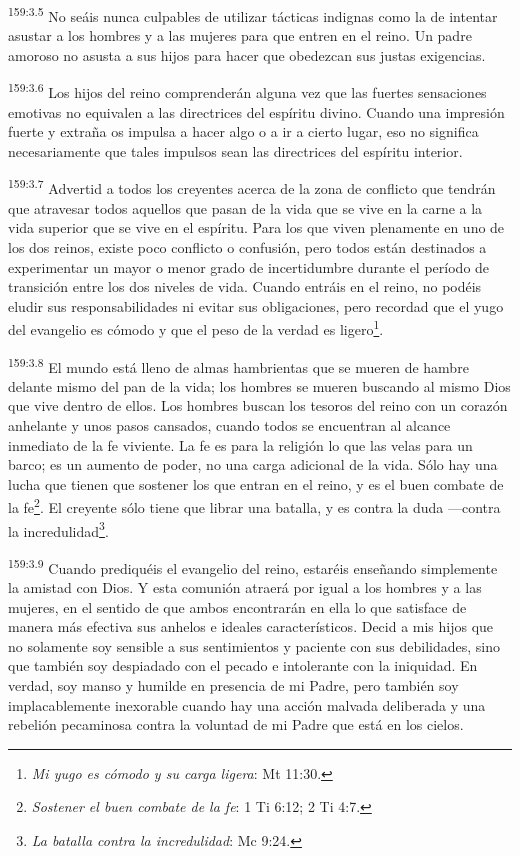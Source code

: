 \par 
\textsuperscript{159:3.5} No seáis nunca culpables de utilizar tácticas indignas como la de intentar asustar a los hombres y a las mujeres para que entren en el reino. Un padre amoroso no asusta a sus hijos para hacer que obedezcan sus justas exigencias.

\par 
\textsuperscript{159:3.6} Los hijos del reino comprenderán alguna vez que las fuertes sensaciones emotivas no equivalen a las directrices del espíritu divino. Cuando una impresión fuerte y extraña os impulsa a hacer algo o a ir a cierto lugar, eso no significa necesariamente que tales impulsos sean las directrices del espíritu interior.

\par 
\textsuperscript{159:3.7} Advertid a todos los creyentes acerca de la zona de conflicto que tendrán que atravesar todos aquellos que pasan de la vida que se vive en la carne a la vida superior que se vive en el espíritu. Para los que viven plenamente en uno de los dos reinos, existe poco conflicto o confusión, pero todos están destinados a experimentar un mayor o menor grado de incertidumbre durante el período de transición entre los dos niveles de vida. Cuando entráis en el reino, no podéis eludir sus responsabilidades ni evitar sus obligaciones, pero recordad que el yugo del evangelio es cómodo y que el peso de la verdad es ligero\footnote{\textit{Mi yugo es cómodo y su carga ligera}: Mt 11:30.}.

\par 
\textsuperscript{159:3.8} El mundo está lleno de almas hambrientas que se mueren de hambre delante mismo del pan de la vida; los hombres se mueren buscando al mismo Dios que vive dentro de ellos. Los hombres buscan los tesoros del reino con un corazón anhelante y unos pasos cansados, cuando todos se encuentran al alcance inmediato de la fe viviente. La fe es para la religión lo que las velas para un barco; es un aumento de poder, no una carga adicional de la vida. Sólo hay una lucha que tienen que sostener los que entran en el reino, y es el buen combate de la fe\footnote{\textit{Sostener el buen combate de la fe}: 1 Ti 6:12; 2 Ti 4:7.}. El creyente sólo tiene que librar una batalla, y es contra la duda ---contra la incredulidad\footnote{\textit{La batalla contra la incredulidad}: Mc 9:24.}.

\par 
\textsuperscript{159:3.9} Cuando prediquéis el evangelio del reino, estaréis enseñando simplemente la amistad con Dios. Y esta comunión atraerá por igual a los hombres y a las mujeres, en el sentido de que ambos encontrarán en ella lo que satisface de manera más efectiva sus anhelos e ideales característicos. Decid a mis hijos que no solamente soy sensible a sus sentimientos y paciente con sus debilidades, sino que también soy despiadado con el pecado e intolerante con la iniquidad. En verdad, soy manso y humilde en presencia de mi Padre, pero también soy implacablemente inexorable cuando hay una acción malvada deliberada y una rebelión pecaminosa contra la voluntad de mi Padre que está en los cielos.

